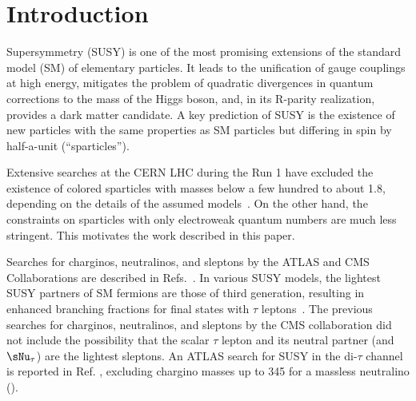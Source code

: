 \section{Introduction}
\label{sect:introduction}

Supersymmetry (SUSY) \cite{Golfand:1971iw,Wess:1973kz,Wess:1974tw,Fayet1,Fayet2} is one of the most promising extensions of the 
standard model (SM) of elementary particles.  It leads to the unification of gauge couplings at
high energy, mitigates the problem of quadratic divergences in quantum corrections to the
mass of the Higgs boson, and, in its R-parity realization, provides a dark matter candidate.
A key prediction of SUSY is the existence of new particles with the same properties as SM particles but
differing in spin by half-a-unit (``sparticles'').

Extensive searches at the CERN LHC during the Run 1 have excluded the existence of colored sparticles with masses below a few hundred \GeV to about 1.8\TeV,
depending on the details of the assumed models~\cite{%
Chatrchyan:2013fea,Chatrchyan:2013mys,Chatrchyan:2014aea,Chatrchyan:2014lfa,%
Khachatryan:2015vra,Khachatryan:2015lwa,Aad:2015pfx,Aad:2015iea}. %
On the other hand, the constraints on sparticles with only electroweak quantum numbers are much less stringent.  This motivates the
work described in this paper.


Searches for charginos, neutralinos, and sleptons by the ATLAS and CMS Collaborations are described in Refs.~\cite{Aad:2014nua,Aad:2014vma,Khachatryan:2014qwa,Khachatryan:2014mma,Khachatryan:2015kxa}.
In various SUSY models, the lightest SUSY partners of SM fermions are those of third generation, 
resulting in enhanced branching fractions for final states with $\tau$ leptons~\cite{Martin:1997ns}.  
The previous searches for charginos, neutralinos,
and sleptons by the CMS collaboration \cite{Khachatryan:2014qwa} 
did not include the possibility that 
the scalar $\tau$ lepton and its neutral partner (\stau and $\sNu_\tau$) 
are the lightest sleptons. An ATLAS search for SUSY in the di-$\tau$ channel is reported in Ref. \cite{Aad:2014yka}, excluding chargino masses up to 345 \GeV 
for a massless neutralino (\PSGczDo).


